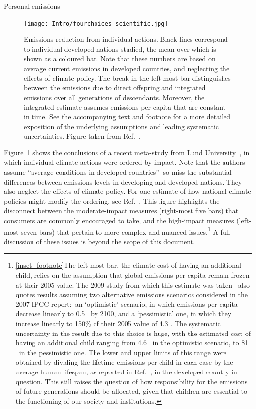 \documentclass[../SustainableHEP.tex]{subfiles}
\begin{document}
\begin{inset}{Personal emissions}%
\begin{figure}
    \captionsetup{type=figure}
    \texttt{[image: Intro/fourchoices-scientific.jpg]}
    \caption[Emissions reduction from individual actions]{Emissions reduction from individual actions.  Black lines correspond to individual developed nations studied, the mean over which is shown as a coloured bar.  Note that these numbers are based on average current emissions in developed countries, and neglecting the effects of climate policy.  The break in the left-most bar distinguishes between the emissions due to direct offspring and integrated emissions over all generations of descendants.  Moreover, the integrated estimate assumes emissions per capita that are constant in time. See the accompanying text and footnote for a more detailed exposition of the underlying assumptions and leading systematic uncertainties. Figure taken from Ref.~\cite{Wynes_2017}.}
    \label{fig:Intro-EffectiveEmissionsReduction}
\end{figure} 
Figure~\ref{fig:Intro-EffectiveEmissionsReduction} shows the conclusions of a recent meta-study from Lund University~\cite{Wynes_2017}, in which individual climate actions were ordered by impact.  Note that the authors assume ``average conditions in developed countries'', so miss the substantial differences between emissions levels in developing and developed nations.  They also neglect the effects of climate policy.  For one estimate of how national climate policies might modify the ordering, see Ref.~\cite{FoundersPledge}. This figure highlights the disconnect between the moderate-impact measures (right-most five bars) that consumers are commonly encouraged to take, and the high-impact measures (left-most seven bars) that pertain to more complex and nuanced issues.\footnote{\ref{inset_footnote}The left-most bar, the climate cost of having an additional child, relies on the assumption that global emissions per capita remain frozen at their 2005 value.  The 2009 study from which this estimate was taken~\cite{MURTAUGH200914} also quotes results assuming two alternative
emissions scenarios considered in the 2007 IPCC report:~an `optimistic' scenario, in which emissions per capita decrease linearly to 0.5 \tCdOe\ by 2100, and a `pessimistic' one, in which they increase linearly to 150\% of their 2005 value of 4.3 \tCdOe.  The systematic uncertainty in the result due to this choice is huge, with the estimated cost of having an additional child ranging from 4.6 \tCdOe\ in the optimistic scenario, to 81 \tCdOe\ in the pessimistic one.  The lower and upper limits of this range were obtained by dividing the lifetime emissions per child in each case by the average human lifespan, as reported in Ref.~\cite{UN2019}, in the developed country in question.
This still raises the question of how responsibility for the emissions of future generations should be allocated, given that children are essential to the functioning of our society and institutions.}
A full discussion of these issues is beyond the scope of this document.
\end{inset}
\end{document}
